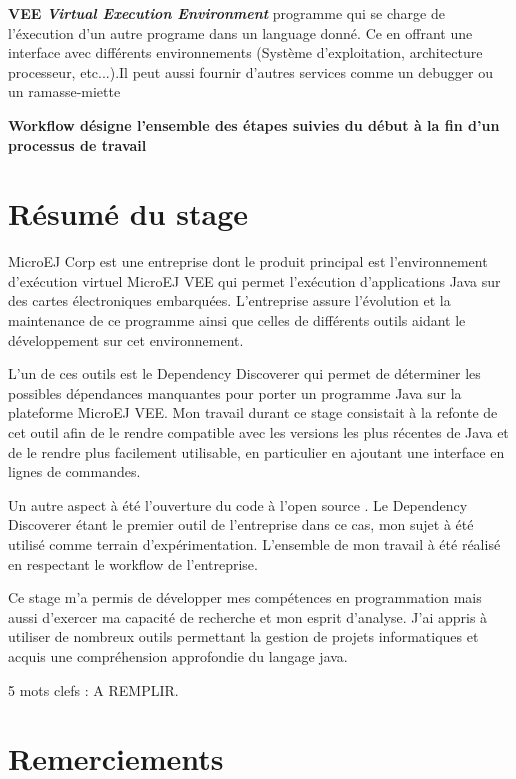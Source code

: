 \documentclass[french,a4paper,12pt]{report}
\begin{document}
\bigskip

\hypertarget{VEE}{\noindent\textbf{VEE \emph{Virtual Execution Environment}} programme qui se charge de l'éxecution d'un autre programe dans un language donné. Ce en offrant une interface avec différents environnements (Système d'exploitation, architecture processeur, etc...).Il peut aussi fournir d'autres services comme un debugger ou un ramasse-miette}

\hypertarget{Workflow}{\noindent\textbf{Workflow désigne l'ensemble des étapes suivies du début à la fin d'un processus de travail}}

\chapter*{Résumé du stage}

MicroEJ Corp est une entreprise dont le produit principal est l'environnement d’exécution virtuel MicroEJ VEE qui permet l’exécution d'applications Java sur des cartes électroniques embarquées. L'entreprise assure l'évolution et la maintenance de ce programme ainsi que celles de différents outils aidant le développement sur cet environnement.

L'un de ces outils est le Dependency Discoverer qui permet de déterminer les possibles dépendances manquantes pour porter un programme Java sur la plateforme MicroEJ VEE. Mon travail durant ce stage consistait à la refonte de cet outil afin de le rendre compatible avec les versions les plus récentes de Java et de le rendre plus facilement utilisable, en particulier en ajoutant une interface en lignes de commandes. 

Un autre aspect à été l'ouverture du code à l'open source . Le Dependency Discoverer étant le premier outil de l'entreprise dans ce cas, mon sujet à été utilisé comme terrain d'expérimentation. L'ensemble de mon travail à été réalisé en respectant le workflow de l'entreprise.

Ce stage m'a permis de développer mes compétences en programmation mais aussi d'exercer ma capacité de recherche et mon esprit d'analyse. J'ai appris à utiliser de nombreux outils permettant la gestion de projets informatiques et acquis une compréhension approfondie du langage java.  

\vspace*{\fill}

5 mots clefs : A REMPLIR.

\chapter*{Remerciements}
\end{document}
